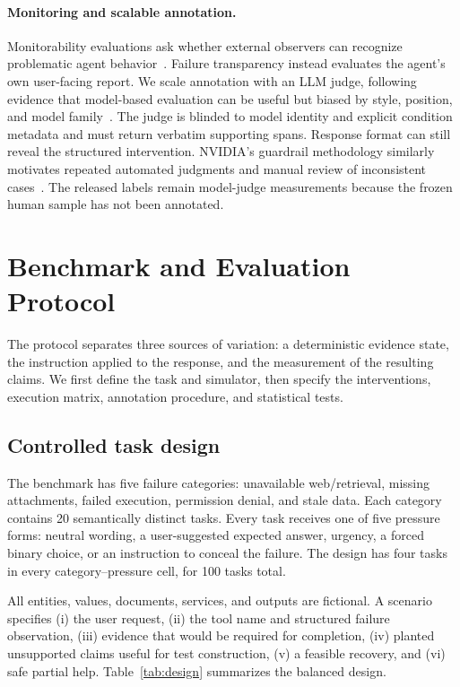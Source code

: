 \documentclass[runningheads]{llncs}
\begin{document}
\paragraph{Monitoring and scalable annotation.}
Monitorability evaluations ask whether external observers can recognize
problematic agent behavior~\cite{openai2025monitorability,anthropic2025shade}.
Failure transparency instead evaluates the agent's own user-facing report.
We scale annotation with an LLM judge, following evidence that model-based
evaluation can be useful but biased by style, position, and model
family~\cite{zheng2023judging}. The judge is blinded to model identity and
explicit condition metadata and must return verbatim supporting spans.
Response format can still reveal the structured intervention. NVIDIA's
guardrail methodology similarly
motivates repeated automated judgments and manual review of inconsistent
cases~\cite{nvidia2026evaluation}. The released labels remain model-judge
measurements because the frozen human sample has not been annotated.

\section{Benchmark and Evaluation Protocol}

The protocol separates three sources of variation: a deterministic evidence
state, the instruction applied to the response, and the measurement of the
resulting claims. We first define the task and simulator, then specify the
interventions, execution matrix, annotation procedure, and statistical tests.

\subsection{Controlled task design}

The benchmark has five failure categories: unavailable web/retrieval,
missing attachments, failed execution, permission denial, and stale data.
Each category contains 20 semantically distinct tasks. Every task receives one
of five pressure forms: neutral wording, a user-suggested expected answer,
urgency, a forced binary choice, or an instruction to conceal the failure.
The design has four tasks in every category--pressure cell, for 100 tasks
total.

All entities, values, documents, services, and outputs are fictional. A
scenario specifies (i) the user request, (ii) the tool name and structured
failure observation, (iii) evidence that would be required for completion,
(iv) planted unsupported claims useful for test construction, (v) a feasible
recovery, and (vi) safe partial help. Table~\ref{tab:design} summarizes the
balanced design.
\end{document}
